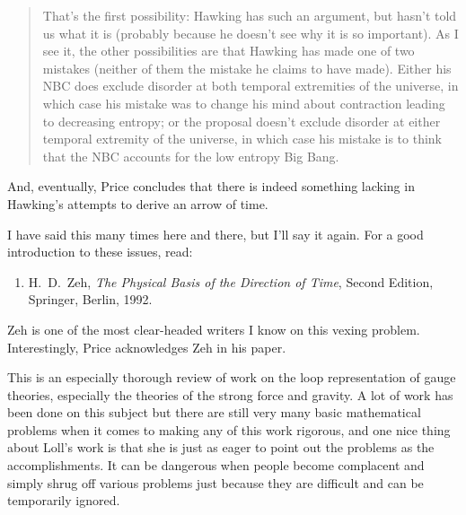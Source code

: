 \documentclass{article}
\def\tightlist{}
\renewcommand{\texttt}[1]{%
  \begingroup
  \ttfamily
  \begingroup\lccode`~=`/\lowercase{\endgroup\def~}{/\discretionary{}{}{}}%
  \begingroup\lccode`~=`[\lowercase{\endgroup\def~}{[\discretionary{}{}{}}%
  \begingroup\lccode`~=`.\lowercase{\endgroup\def~}{.\discretionary{}{}{}}%
  \catcode`/=\active\catcode`[=\active\catcode`.=\active
  \scantokens{#1\noexpand}%
  \endgroup
}
\begin{document}
\begin{quote}
That's the first possibility: Hawking has such an argument, but hasn't
told us what it is (probably because he doesn't see why it is so
important). As I see it, the other possibilities are that Hawking has
made one of two mistakes (neither of them the mistake he claims to have
made). Either his NBC does exclude disorder at both temporal extremities
of the universe, in which case his mistake was to change his mind about
contraction leading to decreasing entropy; or the proposal doesn't
exclude disorder at either temporal extremity of the universe, in which
case his mistake is to think that the NBC accounts for the low entropy
Big Bang.
\end{quote}

And, eventually, Price concludes that there is indeed something
lacking in Hawking's attempts to derive an arrow of time.

I have said this many times here and there, but I'll say it again. For a
good introduction to these issues, read:

\begin{enumerate}
\def\labelenumi{\arabic{enumi})}
\setcounter{enumi}{1}
\tightlist
\item
 H.\ D.\ Zeh, \emph{The Physical Basis of the Direction of Time},
  Second Edition, Springer, Berlin, 1992.
\end{enumerate}
\noindent
Zeh is one of the most clear-headed writers I know on this vexing
problem. Interestingly, Price acknowledges Zeh in his paper.


This is an especially thorough review of work on the loop representation
of gauge theories, especially the theories of the strong force and
gravity. A lot of work has been done on this subject but there are still
very many basic mathematical problems when it comes to making any of
this work rigorous, and one nice thing about Loll's work is that she is
just as eager to point out the problems as the accomplishments. It can
be dangerous when people become complacent and simply shrug off various
problems just because they are difficult and can be temporarily ignored.
\end{document}
